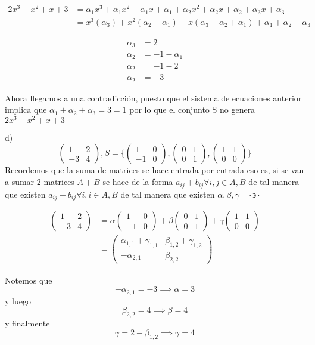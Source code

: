 \documentclass[letterpaper]{article}
\newcommand{\tq}{ \quad \cdot  \backepsilon \cdot \quad }
\renewcommand{\*}{\cdot}
\theoremstyle{definition}
\begin{document}
\begin{eqnarray*}
2x^3 - x^2 + x + 3 &= \alpha_1 x^3 + \alpha_1 x^2 + \alpha_1 x + \alpha_1 + \alpha_2 x^2 + \alpha_2 x + \alpha_2 +\alpha_3 x + \alpha_3 \\
 &= x^3 (\alpha_3)  + x^2 (\alpha_2 + \alpha_1) + x(\alpha_3 + \alpha_2 + \alpha_1) + \alpha_1 + \alpha_2 + \alpha_3
 \end{eqnarray*}

 
\begin{align*}
	\alpha_3 &=  2\\
	\alpha_2 &= -1 - \alpha_1 \\
	\alpha_2 &= -1 - 2\\
	\alpha_2 &= -3
\end{align*}

Ahora llegamos a una contradicción, puesto que el sistema de ecuaciones anterior implica que $\alpha_1 + \alpha_2 + \alpha_3 = 3 = 1$ por lo que el conjunto S no genera $ 2x^3 - x^2 + x + 3$

d) $$ \begin{pmatrix} 1 & 2 \\ -3 & 4 \end{pmatrix},  S =  \lbrace \begin{pmatrix} 1 & 0 \\ -1 & 0 \end{pmatrix} , \begin{pmatrix} 0 & 1 \\ 0 &1 \end{pmatrix} , \begin{pmatrix} 1 & 1 \\ 0 &0 \end{pmatrix} \rbrace$$
Recordemos que la suma de matrices se hace entrada por entrada eso es, si se van a sumar 2 matrices $A + B$ se hace de la forma $a_{ij} + b_{ij}  \forall i,j \in A,B$ de tal manera que existen  $a_{ij} + b_{ij}  \forall i,i \in A,B$ de tal manera que existen $\alpha, \beta, \gamma \tq $

\begin{align*}
 \begin{pmatrix} 1 & 2 \\ -3 & 4 \end{pmatrix} &= \alpha \begin{pmatrix} 1 & 0 \\ -1 & 0 \end{pmatrix}  + \beta \begin{pmatrix} 0 & 1 \\ 0 &1 \end{pmatrix}  + \gamma  \begin{pmatrix} 1 & 1 \\ 0 &0 \end{pmatrix} \\
  & = \begin{pmatrix} \alpha_{1,1}  + \gamma_{1,1} & \beta_{1,2} + \gamma_{1,2} \\ -\alpha_{2,1} & \beta_{2,2} \end{pmatrix}  
\end{align*}

Notemos que $$ -\alpha_{2,1} = -3  \implies  \alpha = 3$$ y luego 
$$\beta_{2,2} = 4 \implies \beta = 4 $$ y finalmente $$\gamma = 2 - \beta_{1,2} \implies \gamma = 4 $$
\end{document}
